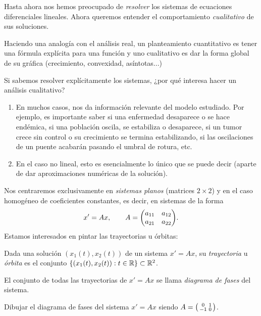 \documentclass[../ecuaciones_diferenciales.tex]{subfiles}
\begin{document}
Hasta ahora nos hemos preocupado de \emph{resolver} los sistemas de ecuaciones
diferenciales lineales. Ahora queremos entender el comportamiento
\emph{cualitativo} de sus soluciones.

Haciendo una analogía con el análisis real, un planteamiento cuantitativo es
tener una fórmula explícita para una función y uno cualitativo es dar la forma
global de su gráfica (crecimiento, convexidad, asíntotas...)

Si sabemos resolver explícitamente los sistemas, ¿por qué interesa hacer un
análisis cualitativo?

\begin{enumerate}[1)]
	\item En muchos casos, nos da información relevante del modelo estudiado. Por
	      ejemplo, es importante saber si una enfermedad desaparece o se hace endémica,
	      si una población oscila, se estabiliza o desaparece, si un tumor crece sin
	      control o su crecimiento se termina estabilizando, si las oscilaciones de un
	      puente acabarán pasando el umbral de rotura, etc.

	\item En el caso no lineal, esto es esencialmente lo único que se puede decir
	      (aparte de dar aproximaciones numéricas de la solución).
\end{enumerate}

Nos centraremos exclusivamente en \emph{sistemas planos} (matrices \(2 \times 2\))
y en el caso homogéneo de coeficientes constantes, es decir, en sistemas de la
forma
\[x' = Ax, \qquad A = \mat{a_{11} & a_{12} \\ a_{21} & a_{22}}.\]
Estamos interesados en pintar las trayectorias u órbitas:

\begin{definition}
	Dada una solución \((x_1(t), x_2(t))\) de un sistema \(x' = Ax\), su
	\emph{trayectoria} u \emph{órbita} es el conjunto
	\(\{(x_1(t), x_2(t)) : t \in \mathbb{R}\} \subset \mathbb{R}^2\).
\end{definition}

\begin{definition}
	El conjunto de todas las trayectorias de \(x' = Ax\) se llama \emph{diagrama
		de fases} del sistema.
\end{definition}

\begin{example}\label{ex:fases_1}
	Dibujar el diagrama de fases del sistema \(x' = Ax\) siendo
	\(A = \smat{0 & 1 \\ -1 & 0}\).
\end{example}
\end{document}
